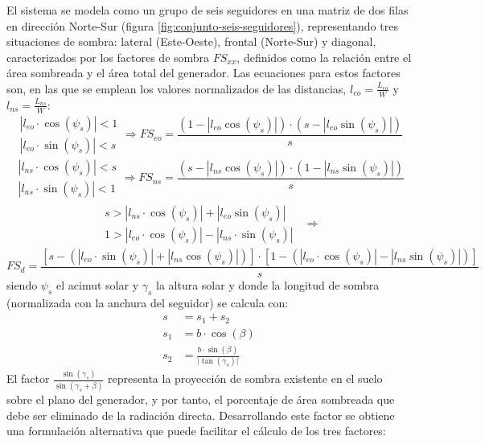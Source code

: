 El sistema se modela como un grupo de seis seguidores en una matriz de dos filas en dirección Norte-Sur (figura \ref{fig:conjunto-seis-seguidores}), representando tres situaciones de sombra: lateral (Este-Oeste), frontal (Norte-Sur) y diagonal, caracterizados por los factores de sombra \(FS_{xx}\), definidos como la relación entre el área sombreada y el área total del generador. Las ecuaciones para estos factores son, en las que se emplean los valores normalizados de las distancias, \(l_{eo}=\frac{L_{eo}}{W}\) y \(l_{ns}=\frac{L_{ns}}{W}\):
\begin{equation}
\begin{array}{c}
|l_{eo}\cdot\cos(\psi_{s})|<1\\
|l_{eo}\cdot\sin(\psi_{s})|<s\end
{array}
\Rightarrow
FS_{eo}=\frac{(1-|l_{eo}\cos(\psi_{s})|)\cdot(s-|l_{eo}\sin(\psi_{s})|)}{s}
\end{equation}
\begin{equation}
\begin{array}{c}
|l_{ns}\cdot\cos(\psi_{s})|<s\\
|l_{ns}\cdot\sin(\psi_{s})|<1
\end{array}
\Rightarrow 
FS_{ns}=\frac{(s-|l_{ns}\cos(\psi_{s})|)\cdot(1-|l_{ns}\sin(\psi_{s})|)}{s}
\end{equation}
\begin{align*}
\begin{array}{c}
s>|l_{ns}\cdot\cos(\psi_{s})|+|l_{eo}\sin(\psi_{s})|\\
1>|l_{eo}\cdot\cos(\psi_{s})|-|l_{ns}\cdot\sin(\psi_{s})|
\end{array} 
& \Rightarrow
\end{align*}
\begin{equation}
FS_{d}=\frac{\left[s-\left(|l_{eo}\cdot\sin(\psi_{s})|+|l_{ns}\cos(\psi_{s})|\right)\right]\cdot\left[1-\left(|l_{eo}\cdot\cos(\psi_{s})|-|l_{ns}\sin(\psi_{s})|\right)\right]}{s}
\end{equation}
siendo \(\psi_{s}\) el acimut solar y \(\gamma_{s}\) la altura solar y donde la longitud de sombra (normalizada con la anchura del seguidor) se calcula con:
\begin{align}
s & =s_{1}+s_{2}\\
s_{1} & =b\cdot\cos(\beta)\\
s_{2} & =\frac{b\cdot\sin(\beta)}{\vert\tan(\gamma_{s})\vert}
\end{align}
El factor \(\frac{\sin(\gamma_{s})}{\sin(\gamma_{s}+\beta)}\) representa 
la proyección de sombra existente en el suelo sobre el plano del generador, y por tanto, el porcentaje de área sombreada que debe ser eliminado de la radiación directa. Desarrollando este factor se obtiene una formulación alternativa que puede facilitar el cálculo de los tres factores:
